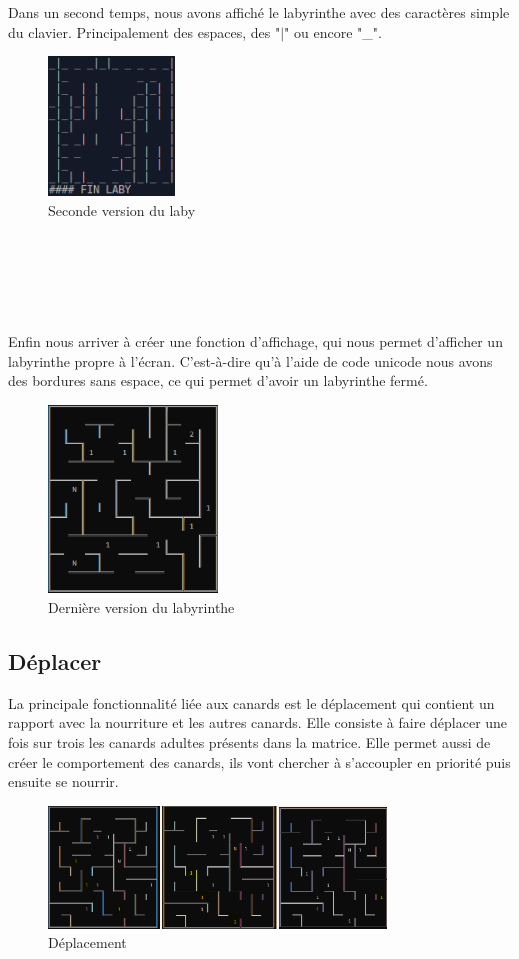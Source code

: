 \documentclass[12pt,a4paper,twoside]{article}
\begin{document}
Dans un second temps, nous avons affiché le labyrinthe avec des caractères simple du clavier. Principalement des espaces, des "$|$" ou encore "\_".\\
\begin{figure}[h!]
\centering
\includegraphics[width=0.3\textwidth]{IMG/laby_deux.png}
\caption{Seconde version du laby}
\end{figure}
\\
\\
\\
\\
\\
Enfin nous arriver à créer une fonction d’affichage, qui nous permet d’afficher un labyrinthe propre à l’écran. C’est-à-dire qu’à l’aide de code unicode nous avons des bordures sans espace, ce qui permet d’avoir un labyrinthe fermé. \\
\begin{figure}[h]
\centering
\includegraphics[width=0.4\textwidth]{IMG/laby_dern.png}
\caption{Dernière version du labyrinthe}
\end{figure}
\subsection{Déplacer}
La principale fonctionnalité liée aux canards est le déplacement qui contient un rapport avec la nourriture et les autres canards. Elle consiste à faire déplacer une fois sur trois les canards adultes présents dans la matrice. Elle permet aussi de créer le comportement des canards, ils vont chercher à s’accoupler en priorité puis ensuite se nourrir. \\
\begin{figure}[h]
\centering
\includegraphics[width=0.8\textwidth]{IMG/deplacer.png}
\caption{Déplacement}
\end{figure}
\end{document}
